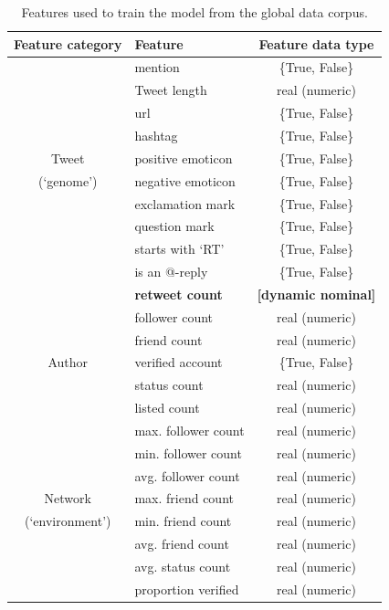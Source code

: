 \begin{table}[h]\footnotesize
\begin{center}
\begin{tabular}{ c | l | c }
	 Feature category	& Feature & Feature data type \\
	 \hline
	 \hline 
	& mention & \{True, False\}\\
    & Tweet length & real (numeric)\\
    & url & \{True, False\}\\
  	& hashtag & \{True, False\}\\
  	Tweet & positive emoticon & \{True, False\}\\
  	(`genome')& negative emoticon & \{True, False\}\\
  	& exclamation mark & \{True, False\}\\
  	& question mark & \{True, False\}\\
  	& starts with `RT' & \{True, False\}\\
  	& is an @-reply & \{True, False\}\\
    & \textbf{retweet count} & \textbf{[dynamic nominal]}\\
  \hline                        
	& follower count & real (numeric)\\
    & friend count  & real (numeric)\\
	Author & verified account & \{True, False\}\\
	& status count & real (numeric)\\
	& listed count & real (numeric)\\
    \hline
  	&  max. follower count & real (numeric)\\
	&  min. follower count & real (numeric)\\
	& avg. follower count & real (numeric)\\
    Network & max. friend count & real (numeric)\\
	(`environment') & min. friend count & real (numeric)\\
	& avg. friend count & real (numeric)\\  
	& avg. status count & real (numeric)\\  
  	& proportion verified & real (numeric)\\  
  \hline  
\end{tabular}
\end{center}
\caption{Features used to train the model from the global data corpus.}
\label{table:globalfeatures}
\end{table}

